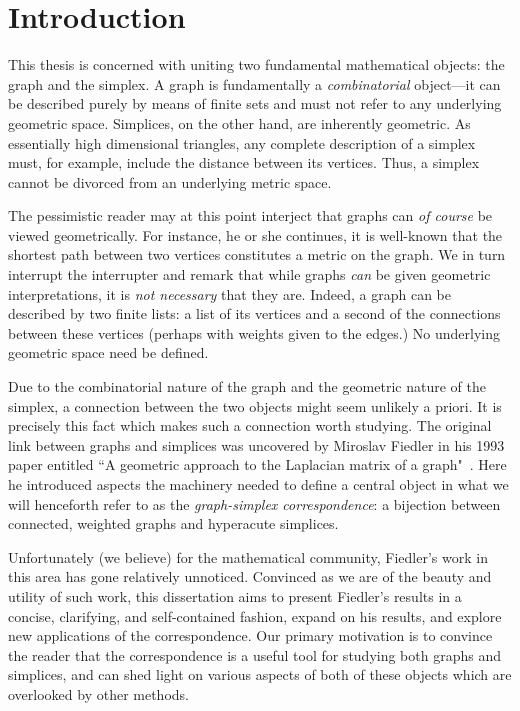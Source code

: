 \chapter{Introduction}
\label{chap:intro}



This thesis is concerned with uniting two fundamental mathematical objects: the graph and the simplex. A graph is fundamentally a  \emph{combinatorial} object---it can be described purely by means of finite sets and must not refer to any underlying geometric space.  
Simplices, on  the other hand, are inherently  geometric. As essentially high dimensional triangles, any complete description of a simplex must, for example, include the distance between its vertices. Thus, a simplex cannot be divorced from an  underlying metric space. 

The pessimistic reader may at  this point interject that graphs can \emph{of course} be viewed geometrically. For instance, he or she continues, it  is well-known that the shortest path between two vertices constitutes  a metric on  the graph. We in turn interrupt the interrupter and remark that while graphs \emph{can} be  given  geometric interpretations, it is \emph{not necessary} that  they are. Indeed, a graph can  be described by two finite lists: a list of its vertices and a second of the connections between these vertices (perhaps with  weights  given  to the  edges.) No underlying geometric space need be defined. 

Due  to the combinatorial  nature of the graph and the geometric nature of the simplex, a connection between the two objects might seem unlikely a priori. It is precisely this fact which makes such a connection worth studying. 
The original  link  between graphs and simplices was uncovered by 
Miroslav Fiedler  in his 1993 paper entitled ``A geometric approach to the Laplacian matrix of a graph"~\cite{fiedler1993geometric}. Here he introduced aspects the machinery needed to define a central  object in what we will henceforth refer to as the \emph{graph-simplex correspondence}: a bijection between connected, weighted graphs and hyperacute simplices. 

Unfortunately (we believe) for  the mathematical community,  Fiedler's work in this area  has  gone relatively unnoticed. Convinced as we are of  the beauty and  utility of such  work, this dissertation aims to present Fiedler's  results in a concise, clarifying, and self-contained fashion,  expand on his results, and explore new applications of the correspondence.   Our primary motivation is to convince the reader that the correspondence is a  useful tool for studying both graphs and simplices,  and  can  shed light on various  aspects of both of these objects which are  overlooked by other  methods. 



